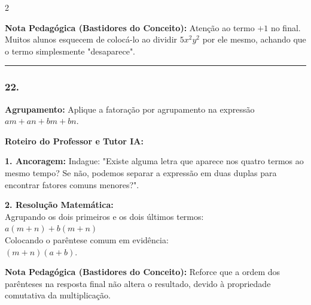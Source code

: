 \begin{multicols*}{2}
    \begin{boxexplicacao}
    \textbf{Nota Pedagógica (Bastidores do Conceito):} Atenção ao termo $+1$ no final. Muitos alunos esquecem de colocá-lo ao dividir $5x^2y^2$ por ele mesmo, achando que o termo simplesmente "desaparece".
    \end{boxexplicacao}
\fi

\par\vspace{\espacoQuestao}

\noindent\textcolor{CorLinha}{\rule{\linewidth}{0.5pt}} 
\par\vspace{\espacoPreQuestao}
\subsubsection*{22.} 
\begin{enunciadoLiteral}
\textbf{Agrupamento:} Aplique a fatoração por agrupamento na expressão $am + an + bm + bn$.
\end{enunciadoLiteral}

\ifgabarito
    \begin{tcolorbox}[colback=CorTitUm!5, colframe=CorTitUm, boxrule=1pt, arc=4pt, left=6pt, right=6pt, top=6pt, bottom=6pt]
    \small\textbf{\textcolor{CorTitUm}{Roteiro do Professor e Tutor IA:}}\par\vspace{0.1cm}
    \color{CinzaEscuro}
    \textbf{1. Ancoragem:} Indague: "Existe alguma letra que aparece nos quatro termos ao mesmo tempo? Se não, podemos separar a expressão em duas duplas para encontrar fatores comuns menores?".\par\vspace{0.1cm}
    \textbf{2. Resolução Matemática:}\\
    Agrupando os dois primeiros e os dois últimos termos:\\
    $a(m + n) + b(m + n)$\\
    Colocando o parêntese comum em evidência:\\
    $(m + n)(a + b)$.
    \end{tcolorbox}
    \vspace{0.15cm}
    
    \begin{boxexplicacao}
    \textbf{Nota Pedagógica (Bastidores do Conceito):} Reforce que a ordem dos parênteses na resposta final não altera o resultado, devido à propriedade comutativa da multiplicação.
    \end{boxexplicacao}
\fi


\end{multicols*}
